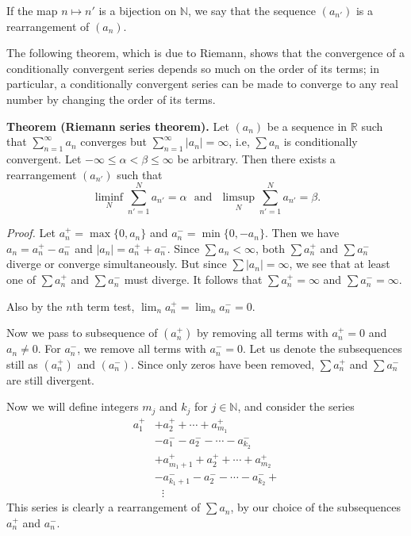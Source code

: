 \documentclass[12pt]{article}
\begin{document}

If the map $n \mapsto n'$ is a bijection on $\mathbb{N}$, we say that the sequence $(a_{n'})$ is a rearrangement of $(a_{n})$. 

The following theorem, which is due to Riemann, shows that the convergence of a conditionally convergent series depends so much on the order of its terms; in particular, a conditionally convergent series can be made to converge to any real number by changing the order of its terms. 

\textbf{Theorem (Riemann series theorem).}
Let $(a_n)$ be a sequence in $\mathbb{R}$  such that $\sum_{n=1}^\infty a_n$ converges but $\sum_{n=1}^\infty |a_n| = \infty$, i.e, $\sum a_n$ is conditionally convergent.   Let $-\infty\leq \alpha < \beta \leq \infty $ be arbitrary. Then there exists a rearrangement $(a_{n'})$  such that 
$$
\liminf_N \sum_{n'=1}^N a_{n'} = \alpha \ \ \ \mbox{and} \ \ \  \limsup_N \sum_{n'=1}^N a_{n'} = \beta.
$$


{\em Proof.}
Let $a_n^+ = \max\{0,a_n\}$ and $a_n^- = \min\{0,-a_n\}$.  Then we have $a_n = a_n^+ - a_n^-$ and $|a_n| = a_n^+ + a_n^-$.  Since $\sum a_n < \infty$, both $\sum a_n^+$ and $\sum a_n^-$ diverge or converge simultaneously. But since $\sum|a_n|=\infty$, we see that at least one of $\sum a_n^+$ and $\sum a_n^-$ must diverge.  It follows that  $\sum a_n^+ = \infty$ and $\sum a_n^- = \infty$.

Also by the $n$th term test, $\lim_n a_n^+ = \lim_n a_n^- = 0$. 

Now we pass to subsequence of $(a_n^+)$ by removing all terms with $a_n^+ = 0$ and $a_n \neq 0$.  For $a_n^-$, we remove all terms with $a_n^- = 0$.   Let us denote the subsequences still as $(a_n^+)$ and $(a_n^-)$.  Since only zeros have been removed, $\sum a_n^+$ and $\sum a_n^-$ are still divergent.

Now we will define integers $m_j$ and $k_j$ for $j\in\mathbb{N}$, and consider the series
\begin{align*}
a^+_1 & + a^+_2 + \cdots + a^+_{m_1}\\
&- a^-_1 - a^-_2 - \cdots - a^-_{k_2}\\
& + a^+_{m_1+1}  + a^+_2 + \cdots + a^+_{m_2}\\
&- a^-_{k_1+1} - a^-_2 - \cdots - a^-_{k_2}+ \\
& \ \ \ \vdots 
\end{align*}
This series is clearly a rearrangement of $\sum a_n$, by our choice of the subsequences $a^+_n$ and $a^-_n$.  
\end{document}
